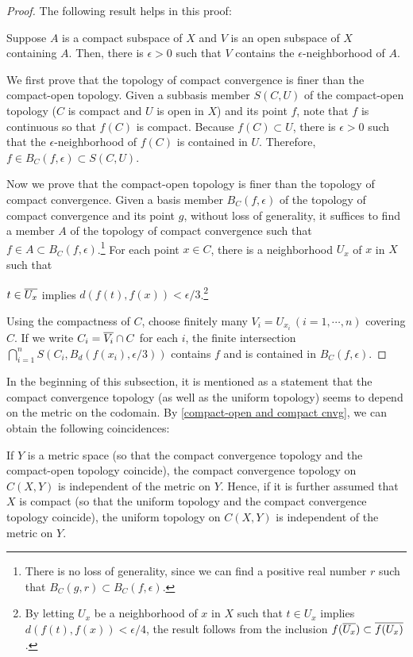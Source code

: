 \begin{proof}
    The following result helps in this proof:
    \begin{center}
        Suppose $A$ is a compact subspace of $X$ and $V$ is an open subspace of $X$ containing $A$.
        Then, there is $\epsilon>0$ such that $V$ contains the $\epsilon$-neighborhood of $A$.
    \end{center}

    We first prove that the topology of compact convergence is finer than the compact-open topology.
    Given a subbasis member $S(C, U)$ of the compact-open topology ($C$ is compact and $U$ is open in $X$) and its point $f$, note that $f$ is continuous so that $f(C)$ is compact.
    Because $f(C)\subset U$, there is $\epsilon>0$ such that the $\epsilon$-neighborhood of $f(C)$ is contained in $U$.
    Therefore, $f\in B_C(f, \epsilon)\subset S(C, U)$.

    Now we prove that the compact-open topology is finer than the topology of compact convergence.
    Given a basis member $B_C(f, \epsilon)$ of the topology of compact convergence and its point $g$, without loss of generality, it suffices to find a member $A$ of the topology of compact convergence such that $f\in A\subset B_C(f, \epsilon)$.\footnote{There is no loss of generality, since we can find a positive real number $r$ such that $B_C(g, r)\subset B_C(f, \epsilon)$.}
    For each point $x\in C$, there is a neighborhood $U_x$ of $x$ in $X$ such that
    \begin{center}
        $t\in\overline{U_x}$ implies $d(f(t), f(x))<\epsilon/3$.\footnote{By letting $U_x$ be a neighborhood of $x$ in $X$ such that $t\in U_x$ implies $d(f(t), f(x))<\epsilon/4$, the result follows from the inclusion $f(\overline{U_x})\subset\overline{f(U_x)}$.}
    \end{center}
    Using the compactness of $C$, choose finitely many $V_i=U_{x_i}\,(i=1, \cdots, n)$ covering $C$.
    If we write $C_i=\overline{V_i}\cap C$ for each $i$, the finite intersection $\bigcap_{i=1}^n S(C_i, B_d(f(x_i), \epsilon/3))$ contains $f$ and is contained in $B_C(f, \epsilon)$.
\end{proof}
In the beginning of this subsection, it is mentioned as a statement that the compact convergence topology (as well as the uniform topology) seems to depend on the metric on the codomain.
By \cref{compact-open and compact cnvg}, we can obtain the following coincidences:
\begin{cor}\label{compact convergence topology is independent}
    If $Y$ is a metric space (so that the compact convergence topology and the compact-open topology coincide), the compact convergence topology on $C(X, Y)$ is independent of the metric on $Y$.
    Hence, if it is further assumed that $X$ is compact (so that the uniform topology and the compact convergence topology coincide), the uniform topology on $C(X, Y)$ is independent of the metric on $Y$.
\end{cor}

